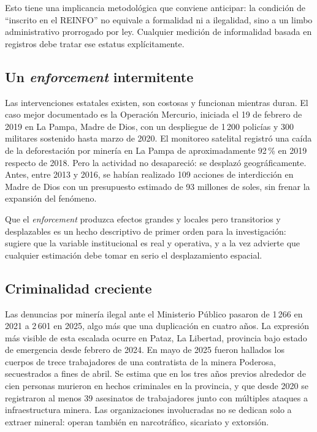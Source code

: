 \documentclass[11pt,a4paper]{article}
\begin{document}
Esto tiene una implicancia metodológica que conviene anticipar: la condición de ``inscrito en el REINFO'' no equivale a formalidad ni a ilegalidad, sino a un limbo administrativo prorrogado por ley. Cualquier medición de informalidad basada en registros debe tratar ese estatus explícitamente.

\subsection{Un \emph{enforcement} intermitente}

Las intervenciones estatales existen, son costosas y funcionan mientras duran. El caso mejor documentado es la Operación Mercurio, iniciada el 19 de febrero de 2019 en La Pampa, Madre de Dios, con un despliegue de 1\,200 policías y 300 militares sostenido hasta marzo de 2020. El monitoreo satelital registró una caída de la deforestación por minería en La Pampa de aproximadamente 92\,\% en 2019 respecto de 2018. Pero la actividad no desapareció: se desplazó geográficamente. Antes, entre 2013 y 2016, se habían realizado 109 acciones de interdicción en Madre de Dios con un presupuesto estimado de 93 millones de soles, sin frenar la expansión del fenómeno.

Que el \emph{enforcement} produzca efectos grandes y locales pero transitorios y desplazables es un hecho descriptivo de primer orden para la investigación: sugiere que la variable institucional es real y operativa, y a la vez advierte que cualquier estimación debe tomar en serio el desplazamiento espacial.

\subsection{Criminalidad creciente}

Las denuncias por minería ilegal ante el Ministerio Público pasaron de 1\,266 en 2021 a 2\,601 en 2025, algo más que una duplicación en cuatro años. La expresión más visible de esta escalada ocurre en Pataz, La Libertad, provincia bajo estado de emergencia desde febrero de 2024. En mayo de 2025 fueron hallados los cuerpos de trece trabajadores de una contratista de la minera Poderosa, secuestrados a fines de abril. Se estima que en los tres años previos alrededor de cien personas murieron en hechos criminales en la provincia, y que desde 2020 se registraron al menos 39 asesinatos de trabajadores junto con múltiples ataques a infraestructura minera. Las organizaciones involucradas no se dedican solo a extraer mineral: operan también en narcotráfico, sicariato y extorsión.
\end{document}
